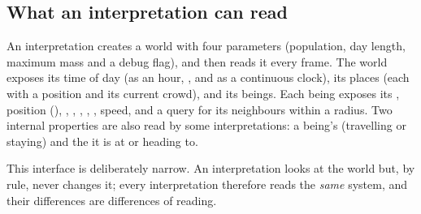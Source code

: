 \subsection{What an interpretation can read}

An interpretation creates a world with four parameters (population, day length, maximum mass and a debug flag), and then reads it every frame. The world exposes its time of day (as an hour, , and as a continuous clock), its places (each with a position and its current crowd), and its beings. Each being exposes its , position (), , , , , , speed, and a query for its neighbours within a radius. Two internal properties are also read by some interpretations: a being's  (travelling or staying) and the  it is at or heading to.

This interface is deliberately narrow. An interpretation looks at the world but, by rule, never changes it; every interpretation therefore reads the \emph{same} system, and their differences are differences of reading.
